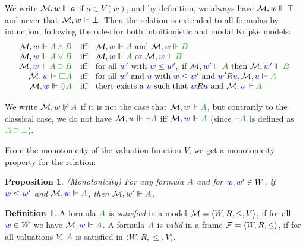 \documentclass[a4paper]{article}
\theoremstyle{plain}
\newtheorem{proposition}[theorem]{Proposition}
\theoremstyle{definition}
\newtheorem{definition}[theorem]{Definition}
\newcommand*{\AND}{\mathbin{\wedge}}
\newcommand*{\OR}{\mathbin{\vee}}
\newcommand*{\IMP}{\mathbin{\scalebox{.9}{\raise.2ex\hbox{$\supset$}}}}
\newcommand*{\BOX}{\mathord{\Box}}
\newcommand*{\DIA}{\mathord{\Diamond}}
\newcommand*{\fm}[1]{{\color{notgreen}{#1}}}
\newcommand*{\lb}[1]{{\color{blue}{#1}}}
\newcommand*{\accs}[2]{\lb{#1}R\lb{#2}}
\newcommand*{\futs}[2]{\lb{#1}\le{\color{blue}{#2}}}
\newcommand*{\rel}{R}
\begin{document}
We write $\M, w \Vdash a$ if $a \in V(w)$, and by definition, we always have $\M, w \Vdash \top$ and never that $\M, w \Vdash \bot$. 
%
Then the relation is extended to all formulas by induction, following the rules for both intuitionistic and modal Kripke models:
$$
\begin{array}{rcl}
\label{eq:kripke}

	\M, \lb w \Vdash \fm{A \AND B} & \mbox{iff} & \M, \lb w \Vdash \fm A \mbox{ and } \M, \lb w \Vdash \fm B\\
	
	\M, \lb w \Vdash \fm{A \OR B} & \mbox{iff} & \M, \lb w \Vdash \fm A \mbox{ or } \M, \lb w \Vdash \fm B\\

	\M, \lb w \Vdash \fm{A \IMP B} & \mbox{iff} & \mbox{for all } \lb{w'} \mbox{ with } \futs w{w'}, \mbox{ if } \M, \lb{w'} \Vdash \fm A \mbox{ then } \M, \lb{w'} \Vdash \fm B\\
	
	\M, \lb w \Vdash \fm{\BOX A} & \mbox{iff} & \mbox{for all } \lb{w'} \mbox{ and } \lb u \mbox{ with } \futs w{w'} \mbox{ and } \accs {w'}u, \M, \lb u \Vdash \fm A \hfill \\ %
	
	\M, \lb w \Vdash \fm{\DIA A} & \mbox{iff} & \mbox{there exists a } \lb u \mbox{ such that } \accs wu \mbox{ and } \M, \lb u \Vdash \fm A.
	
\end{array}
$$


We write $\M, \lb w \not\Vdash \fm A$ if it is not the case that $\M, \lb w \Vdash \fm A$, but contrarily to the classical case, we do not have $\M, \lb w \Vdash \fm{\neg A}$ iff $\M, \lb w \Vdash \fm A$ (since $\fm{\neg A}$ is defined as $\fm{A \IMP \bot}$).

From the monotonicity of the valuation function $V$, we get a monotonicity property for the relation:
\begin{proposition}(Monotonicity) 
	For any formula $\fm A$ and for $\lb w, \lb{w'} \in W$, if $\futs w{w'}$ and $\M, \lb w \Vdash \fm A$, then $\M, \lb{w'} \Vdash \fm A$.
\end{proposition}



\begin{definition}
	A formula $\fm A$ is \emph{satisfied} in a model $\M = \langle W, \rel, \le, V \rangle$, if for all $\lb w \in W$ we have $\M, \lb w \Vdash \fm A$.
	A formula $\fm A$ is \emph{valid} in a frame $\F = \langle W, \rel, \le \rangle$, if for all valuations $V$, $\fm A$ is satisfied in $\langle W, R, \le, V \rangle$.
\end{definition}
\end{document}
